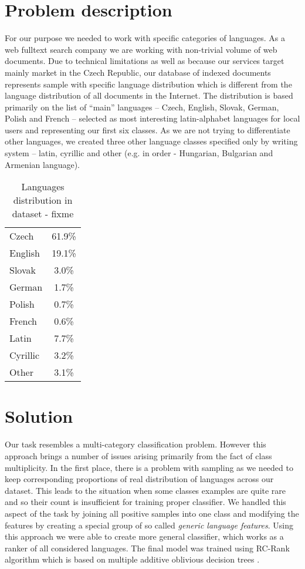 \documentclass{acm_proc_article-sp}
\begin{document}
\section{Problem description}

  For our purpose we needed to work with specific categories of languages.
  As a web fulltext search company we are working with non-trivial volume of web documents.
  Due to technical limitations as well as because our services target mainly market in the Czech Republic,
  our database of indexed documents represents sample with specific language distribution which is different from the
  language distribution of all documents in the Internet.
  The distribution is based primarily on the list of “main” languages –
  Czech, English, Slovak, German, Polish and French –
  selected as most interesting latin-alphabet languages for local users and representing  our first six classes.
  As we are not trying to differentiate other languages, we created three other language classes specified only by writing system
  – latin, cyrillic and other (e.g. in order - Hungarian, Bulgarian and Armenian language).

  \begin{table}[]
 \centering
 \caption{Languages distribution in dataset - fixme} 
 \label{langdist} 
 \vspace{0.5cm}
 \begin{tabular}{l||c}
    Czech & 61.9\% \\
    English & 19.1\% \\
    Slovak & 3.0\% \\
    German & 1.7\% \\
    Polish & 0.7\% \\
    French & 0.6\% \\ \hline
    Latin & 7.7\% \\
    Cyrillic & 3.2\% \\
    Other & 3.1\% \\
 \end{tabular}
 \end{table}


  \section{Solution}

  Our task resembles a multi-category classification problem. 
  However this approach brings a number of issues arising primarily from the fact of class multiplicity. 
  In the first place, there is a problem with sampling as we needed to keep corresponding proportions 
  of real distribution of languages across our dataset. 
  This leads to the situation when some classes examples are quite rare and so their count is insufficient 
  for training proper classifier. We handled this aspect of the task by joining all positive samples 
  into one class and modifying the features by creating a special group of so called \textit{generic language features}. 
  Using this approach we were able to create more general classifier, which works as a ranker of all considered languages. 
  The final model was trained using RC-Rank algorithm which is based on multiple additive oblivious decision trees \cite{maimon:datamining}. 
\end{document}
